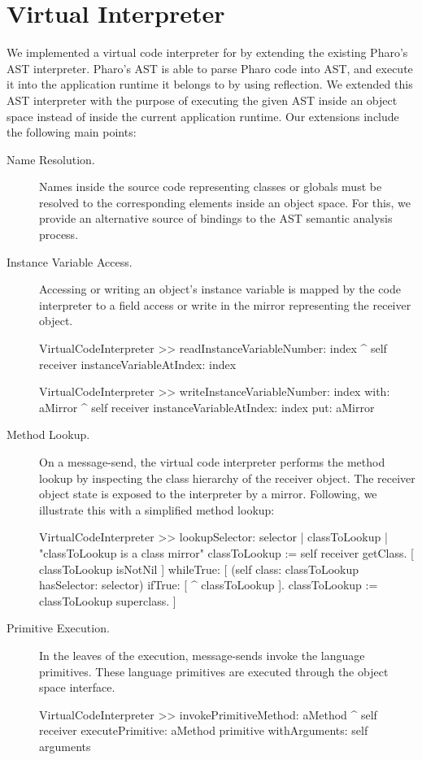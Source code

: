 \section{\Vtt Virtual Interpreter} \label{sec:memory}

We implemented a virtual code interpreter for \Vtt by extending the existing Pharo's AST interpreter. Pharo's AST is able to parse Pharo code into AST, and execute it into the application runtime it belongs to by using reflection. We extended this AST interpreter with the purpose of executing the given AST inside an object space instead of inside the current application runtime. Our extensions include the following main points:

\begin{description}
\item[Name Resolution.] Names inside the source code representing \eg classes or globals must be resolved to the corresponding elements inside an object space. For this, we provide an alternative source of bindings to the AST semantic analysis process.

\item[Instance Variable Access.] Accessing or writing an object's instance variable is mapped by the code interpreter to a field access or write in the mirror representing the receiver object.

\begin{code}
VirtualCodeInterpreter >> readInstanceVariableNumber: index
    ^ self receiver instanceVariableAtIndex: index
    
VirtualCodeInterpreter >> writeInstanceVariableNumber: index with: aMirror
    ^ self receiver instanceVariableAtIndex: index put: aMirror
\end{code}

\item[Method Lookup.] On a message-send, the virtual code interpreter performs the method lookup by inspecting the class hierarchy of the receiver object. The receiver object state is exposed to the interpreter by a mirror. Following, we illustrate this with a simplified method lookup:

\begin{code}
VirtualCodeInterpreter >> lookupSelector: selector
    | classToLookup |
    "classToLookup is a class mirror"
    classToLookup := self receiver getClass.
    [ classToLookup isNotNil ] whileTrue: [
        (self class: classToLookup hasSelector: selector)
        	    ifTrue: [ ^ classToLookup ].
	classToLookup := classToLookup superclass.
    ]
\end{code}

\item[Primitive Execution.] In the leaves of the execution, message-sends invoke the language primitives. These language primitives are executed through the object space interface.

\begin{code}
VirtualCodeInterpreter >> invokePrimitiveMethod: aMethod
    ^ self receiver
         executePrimitive: aMethod primitive
         withArguments: self arguments
\end{code}

\end{description}


